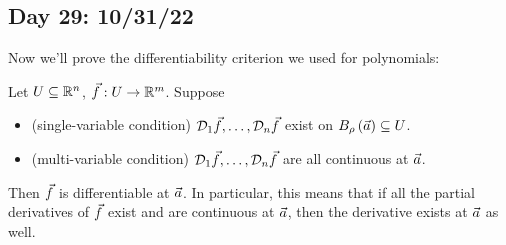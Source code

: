 \documentclass[main.tex]{subfiles}
\begin{document}
\subsection{Day 29: 10/31/22}
Now we'll prove the differentiability criterion we used for polynomials:
\begin{theorem}
    Let $U\subseteq \mathbb R^n$, $\vec{f} : U \to \mathbb R^m$. Suppose
    \begin{itemize}
        \item (single-variable condition) $\mathcal{D}_1\vec{f}, \ldots , \mathcal{D}_n\vec{f}$ exist on $B_\rho\left( \vec{a} \right)\subseteq U$.
        \item (multi-variable condition) $\mathcal{D}_1\vec{f}, \ldots , \mathcal{D}_n\vec{f}$ are all continuous at $\vec{a}$.
    \end{itemize}
    Then $\vec{f}$ is differentiable at $\vec{a}$. In particular, this means that if all the partial derivatives of $\vec{f}$ exist and are continuous at $\vec{a}$, then the derivative exists at $\vec{a}$ as well.
\end{theorem}
\end{document}
